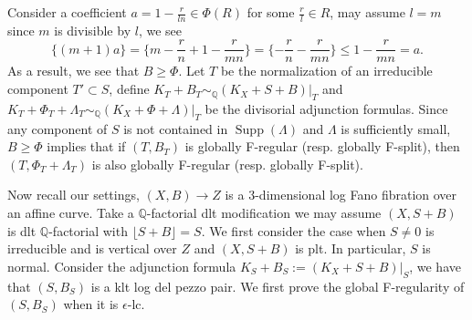 \documentclass[letterpaper,reqno,12pt]{amsart}
\DeclareMathOperator{\Supp}{Supp}
\numberwithin{equation}{section}
\theoremstyle{plain}
\begin{document}
Consider a coefficient $a=1-\frac{r}{ln}\in\Phi(R)$ for some $\frac{r}{l}\in R$, may assume $l=m$ since $m$ is divisible by $l$, we see \[\{(m+1)a\}=\{m-\frac{r}{n}+1-\frac{r}{mn}\}=\{-\frac{r}{n}-\frac{r}{mn}\}\leq 1-\frac{r}{mn}=a.\] As a result, we see that $B\geq \Phi$. Let $T$ be the normalization of an irreducible component $T'\subset S$, define $K_T+B_T\sim_\mathbb Q(K_X+S+B)|_T$ and $K_T+\Phi_T+\Lambda_T\sim_\mathbb Q (K_X+\Phi+\Lambda)|_T$ be the divisorial adjunction formulas. Since any component of $S$ is not contained in $\Supp(\Lambda)$ and $\Lambda$ is sufficiently small, $B\geq \Phi$ implies that if $(T,B_T)$ is globally F-regular (resp. globally F-split), then $(T,\Phi_T+\Lambda_T)$ is also globally F-regular (resp. globally F-split).

Now recall our settings, $(X,B)\to Z$ is a 3-dimensional log Fano fibration over an affine curve. Take a $\mathbb Q$-factorial dlt modification we may assume $(X,S+B)$ is dlt $\mathbb Q$-factorial with $\lfloor S+B\rfloor=S$. We first consider the case when $S\neq0$ is irreducible and is vertical over $Z$ and $(X,S+B)$ is plt. In particular, $S$ is normal. Consider the adjunction formula $K_S+B_S:=(K_X+S+B)|_S$, we have that $(S,B_S)$ is a klt log del pezzo pair. We first prove the global F-regularity of $(S,B_S)$ when it is $\epsilon$-lc.
\end{document}

